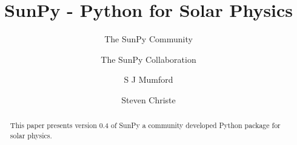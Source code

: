\documentclass[12pt]{iopart}
\begin{document}
\title{SunPy - Python for Solar Physics}

\author{The SunPy Community}
\address{\url{http://sunpy.org}}

\author{The SunPy Collaboration}
\address{}

\author{S J Mumford}
\address{Solar Physics \& Space Plasma Research Centre (SP$^{2}$RC), School of 
Mathematics and Statistics, The University of Sheffield, Hicks Building, 
Hounsfield Road, Sheffield, S3 7RH U.K.}

\author{Steven Christe}
\address{NASA Goddard Space Flight Center, Greenbelt, U.S.A.}

\begin{abstract}
This paper presents version 0.4 of SunPy a community developed Python package 
for solar physics.

\end{abstract}

\maketitle


\label{sec:Intro}


\label{sec:DataTypes}


\label{sec:retrevial}


\label{sec:util}


\label{sec:dev}


\label{sec:future}

{}
\end{document}
